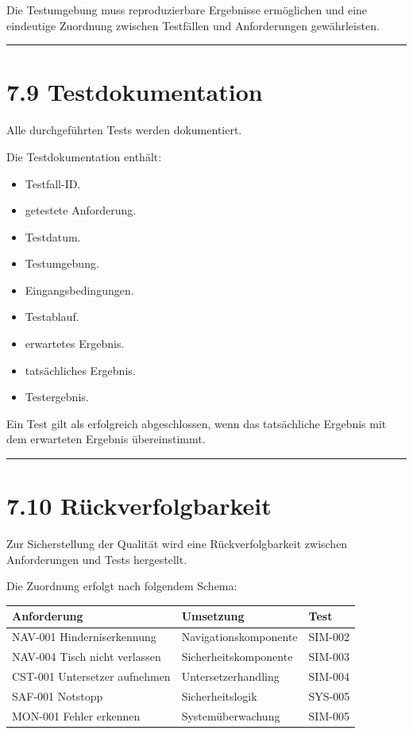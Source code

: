 \documentclass[
  a4paper,
  12pt,
  DIV=12,        %
  parskip=half,  %
  headings=small %
]{scrartcl}
\theoremstyle{definition}
\providecommand{\tightlist}{%
  \setlength{\itemsep}{0pt}\setlength{\parskip}{0pt}}
\theoremstyle{definition}
\providecommand{\tightlist}{%
  \setlength{\itemsep}{0pt}\setlength{\parskip}{0pt}}
\begin{document}
Die Testumgebung muss reproduzierbare Ergebnisse ermöglichen und eine
eindeutige Zuordnung zwischen Testfällen und Anforderungen
gewährleisten.

\begin{center}\rule{0.5\linewidth}{0.5pt}\end{center}

\section{7.9 Testdokumentation}\label{testdokumentation}

Alle durchgeführten Tests werden dokumentiert.

Die Testdokumentation enthält:

\begin{itemize}
\tightlist
\item
  Testfall-ID.
\item
  getestete Anforderung.
\item
  Testdatum.
\item
  Testumgebung.
\item
  Eingangsbedingungen.
\item
  Testablauf.
\item
  erwartetes Ergebnis.
\item
  tatsächliches Ergebnis.
\item
  Testergebnis.
\end{itemize}

Ein Test gilt als erfolgreich abgeschlossen, wenn das tatsächliche
Ergebnis mit dem erwarteten Ergebnis übereinstimmt.

\begin{center}\rule{0.5\linewidth}{0.5pt}\end{center}

\section{7.10 Rückverfolgbarkeit}\label{ruxfcckverfolgbarkeit}

Zur Sicherstellung der Qualität wird eine Rückverfolgbarkeit zwischen
Anforderungen und Tests hergestellt.

Die Zuordnung erfolgt nach folgendem Schema:

\begin{longtable}[]{@{}lll@{}}
\toprule\noalign{}
Anforderung & Umsetzung & Test \\
\midrule\noalign{}
\endhead
\bottomrule\noalign{}
\endlastfoot
NAV-001 Hinderniserkennung & Navigationskomponente & SIM-002 \\
NAV-004 Tisch nicht verlassen & Sicherheitskomponente & SIM-003 \\
CST-001 Untersetzer aufnehmen & Untersetzerhandling & SIM-004 \\
SAF-001 Notstopp & Sicherheitslogik & SYS-005 \\
MON-001 Fehler erkennen & Systemüberwachung & SIM-005 \\
\end{longtable}
\end{document}
